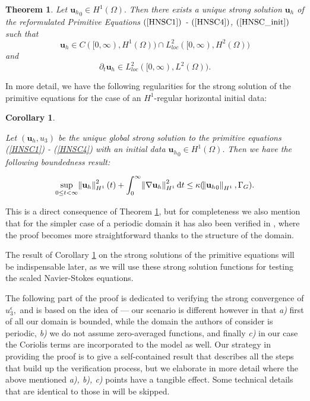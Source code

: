 \documentclass[11pt]{article}
\newtheorem{theorem}{Theorem}
\newtheorem{corollary}{Corollary}
\newcommand*\diff{\mathop{}\!\mathrm{d}}
\begin{document}
\begin{theorem} \label{PE3DWellPosedness}
Let ${\mathbf{u}_h}_0 \in H^1(\Omega).$ Then there exists a unique strong solution $\mathbf{u}_h$ of the reformulated Primitive Equations $(\ref{HNSC1})$ - $(\ref{HNSC4})$, $(\ref{HNSC_init})$ such that $$\mathbf{u}_h \in C([0, \infty), H^1(\Omega)) \cap L^2_{loc}([0, \infty), H^2(\Omega))$$ and $$\partial_t \mathbf{u}_h \in L^2_{loc} ([0,\infty), L^2(\Omega)).$$
\end{theorem}

In more detail, we have the following regularities for the strong solution of the primitive equations for the case of an $H^1$-regular horizontal initial data:

\begin{corollary} \label{StrongSolPE_boundedness}

Let $(\mathbf{u}_h,u_3)$ be the unique global strong solution to the primitive equations (\ref{HNSC1}) - (\ref{HNSC4}) with an initial data ${\mathbf{u}_h}_0 \in H^1(\Omega).$ Then we have the following boundedness result:

$$ \sup_{0 \leq t < \infty} \norm{\mathbf{u}_h}_{H^1}^2 (t) + \int_0^\infty \norm{\nabla \mathbf{u}_h}_{H^1}^2 \diff t \leq \kappa (\norm{{\mathbf{u}_h}_0}_{H^1}, \Gamma_G).$$

\end{corollary}

This is a direct consequence of Theorem \ref{PE3DWellPosedness}, but for completeness we also mention that for the simpler case of a periodic domain it has also been verified in \cite{li2019primitive}, where the proof becomes more straightforward thanks to the structure of the domain.

The result of Corollary \ref{StrongSolPE_boundedness} on the strong solutions of the primitive equations will be indispensable later, as we will use these strong solution functions for testing the scaled Navier-Stokes equations.

The following part of the proof is dedicated to verifying the strong convergence of $u_3^\epsilon,$ and is based on the idea of \cite{li2019primitive} --- our scenario is different however in that \textit{a)} first of all our domain is bounded, while the domain the authors of \cite{li2019primitive} consider is periodic, \textit{b)} we do not assume zero-averaged functions, and finally \textit{c)} in our case the Coriolis terms are incorporated to the model as well. Our strategy in providing the proof is to give a self-contained result that describes all the steps that build up the verification process, but we elaborate in more detail where the above mentioned \textit{a), b), c)} points have a tangible effect. Some technical details that are identical to those in \cite{li2019primitive} will be skipped.
\end{document}
